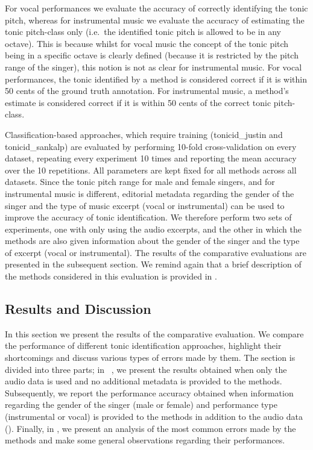 For vocal performances we evaluate the accuracy of correctly identifying the tonic pitch, whereas for instrumental music we evaluate the accuracy of estimating the tonic pitch-class only (i.e.~the identified tonic pitch is allowed to be in any octave). This is because whilst for vocal music the concept of the tonic pitch being in a specific octave is clearly defined (because it is restricted by the pitch range of the singer), this notion is not as clear for instrumental music. For vocal performances, the tonic identified by a method is considered correct if it is within 50 cents of the ground truth annotation. For instrumental music, a method's estimate is considered correct if it is within 50 cents of the correct tonic pitch-class.

Classification-based approaches, which require training (\acrshort{tonicid_justin} and \acrshort{tonicid_sankalp}) are evaluated by performing 10-fold cross-validation on every dataset, repeating every experiment 10 times and reporting the mean accuracy over the 10 repetitions. All parameters are kept fixed for all methods across all datasets. Since the tonic pitch range for male and female singers, and for instrumental music is different, editorial metadata regarding the gender of the singer and the type of music excerpt (vocal or instrumental) can be used to improve the accuracy of tonic identification. We therefore perform two sets of experiments, one with only using the audio excerpts, and the other in which the methods are also given information about the gender of the singer and the type of excerpt (vocal or instrumental). The results of the comparative evaluations are presented in the subsequent section. We remind again that a brief description of the methods considered in this evaluation is provided in .


\subsection{Results and Discussion}
\label{sec:pre_processing_tonic_identification_results}

In this section we present the results of the comparative evaluation. We compare the performance of different tonic identification approaches, highlight their shortcomings and discuss various types of errors made by them. The section is divided into three parts; in ~, we present the results obtained when only the audio data is used and no additional metadata is provided to the methods. Subsequently, we report the performance accuracy
obtained when information regarding the gender of the singer (male or female) and performance type (instrumental or vocal) is provided to the methods in addition to the audio data (). Finally, in , we present an analysis of the most common errors made by the methods and make some general observations regarding their performances.



